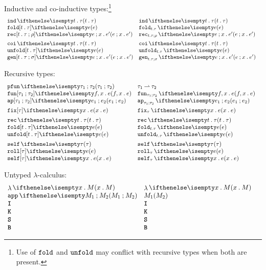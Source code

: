 \documentclass[11pt,twoside]{article}
\begin{document}
Inductive and co-inductive types:\footnote{Use of $\Opn{fold}$ and $\Opn{unfold}$ may conflict with recursive types when both are present.}
\begin{displaymath}
  \begin{array}{l@{\quad}l@{\quad}l}
    \indty{t}{\tau} & \indty*{t}{\tau} \\
    \foldex[t][\tau]{e} & \foldex*{e} \\
    \recex[t][\tau][\rho]{e}{x}{e'} & \recex*{e}{x}{e'} \\[1ex]
    \coity{t}{\tau} & \coity*{t}{\tau} \\
    \unfoldex[t][\tau]{e} & \unfoldex*{e} \\
    \genex[t][\tau][\sigma]{e}{x}{e'} & \genex*{e}{x}{e'}
  \end{array}
\end{displaymath}

Recursive types:
\begin{displaymath}
  \begin{array}{l@{\quad}l@{\quad}l}

    \parrty{\tau_1}{\tau_2} & \parrty*{\tau_1}{\tau_2} \\
    \funex{f}{x}{e} & \funex*{f}{x}{e} \\
    \appex{e_1}{e_2} & \appex*{e_1}{e_2} \\[1ex]

    \fixex[\tau]{x}{e} & \fixex*[\tau]{x}{e}  \\[1ex]

    \recty{t}{\tau} & \recty*{t}{\tau} \\
    \foldex[t][\tau]{e}  & \foldex*{e} \\
    \unfoldex[t][\tau]{e} & \unfoldex*{e} \\[1ex]

    \selfty{\tau}  & \selfty*{\tau} \\
    \rollex[\tau]{e} & \rollex*{e} \\
    \selfex[\tau]{x}{e} & \selfex*{x}{e}
  \end{array}
\end{displaymath}

Untyped $\lambda$-calculus:
\begin{displaymath}
  \begin{array}{l@{\quad}l@{\quad}l}
    \ulamex{x}{M} & \ulamex*{x}{M} \\
    \uapex{M_1}{M_2} & \uapex*{M_1}{M_2} \\
    \uIex & \uIex* \\
    \uKex & \uKex* \\
    \uSex & \uSex& \\
    \uBex & \uBex*
  \end{array}
\end{displaymath}
\end{document}
